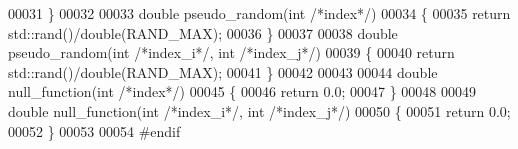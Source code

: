 \begin{DoxyCode}
00031 \}
00032 
00033 \textcolor{keywordtype}{double} pseudo\_random(\textcolor{keywordtype}{int} \textcolor{comment}{/*index*/})
00034 \{
00035   \textcolor{keywordflow}{return} std::rand()/double(RAND\_MAX);
00036 \}
00037 
00038 \textcolor{keywordtype}{double} pseudo\_random(\textcolor{keywordtype}{int} \textcolor{comment}{/*index\_i*/}, \textcolor{keywordtype}{int} \textcolor{comment}{/*index\_j*/})
00039 \{
00040   \textcolor{keywordflow}{return} std::rand()/double(RAND\_MAX);
00041 \}
00042 
00043 
00044 \textcolor{keywordtype}{double} null\_function(\textcolor{keywordtype}{int} \textcolor{comment}{/*index*/})
00045 \{
00046   \textcolor{keywordflow}{return} 0.0;
00047 \}
00048 
00049 \textcolor{keywordtype}{double} null\_function(\textcolor{keywordtype}{int} \textcolor{comment}{/*index\_i*/}, \textcolor{keywordtype}{int} \textcolor{comment}{/*index\_j*/})
00050 \{
00051   \textcolor{keywordflow}{return} 0.0;
00052 \}
00053 
00054 \textcolor{preprocessor}{#endif}
\end{DoxyCode}

